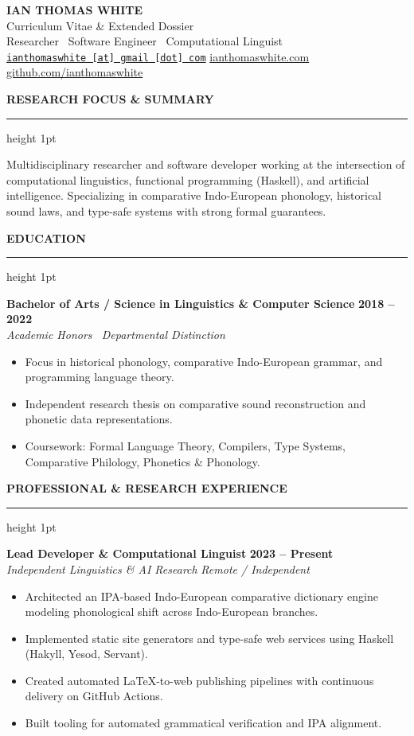 \documentclass[10pt,letterpaper]{article}
\newcommand{\cvsection}[1]{%
    \vspace{10pt}%
    {\large\bfseries\uppercase{#1}}%
    \vspace{2pt}%
    \hrule height 1pt%
    \vspace{6pt}%
}
\begin{document}
\begin{center}
    {\huge\bfseries IAN THOMAS WHITE} \\[4pt]
    {\large Curriculum Vitae \& Extended Dossier} \\[3pt]
    {\color{subtext} Researcher \textbar\ Software Engineer \textbar\ Computational Linguist} \\[4pt]
    \href{mailto:ianthomaswhite@gmail.com}{\texttt{ianthomaswhite\,[at]\,gmail\,[dot]\,com}} \quad\textbar\quad
    \href{https://ianthomaswhite.com}{ianthomaswhite.com} \quad\textbar\quad
    \href{https://github.com/ianthomaswhite}{github.com/ianthomaswhite}
\end{center}

\vspace{5pt}

\cvsection{Research Focus \& Summary}
Multidisciplinary researcher and software developer working at the intersection of computational linguistics, functional programming (Haskell), and artificial intelligence. Specializing in comparative Indo-European phonology, historical sound laws, and type-safe systems with strong formal guarantees.

\cvsection{Education}
\textbf{Bachelor of Arts / Science in Linguistics \& Computer Science} \hfill \textbf{2018 -- 2022} \\
{\color{subtext}\textit{Academic Honors \textbar\ Departmental Distinction}}
\begin{itemize}
    \item Focus in historical phonology, comparative Indo-European grammar, and programming language theory.
    \item Independent research thesis on comparative sound reconstruction and phonetic data representations.
    \item Coursework: Formal Language Theory, Compilers, Type Systems, Comparative Philology, Phonetics \& Phonology.
\end{itemize}

\cvsection{Professional \& Research Experience}
\textbf{Lead Developer \& Computational Linguist} \hfill \textbf{2023 -- Present} \\
\textit{Independent Linguistics \& AI Research} \hfill \textit{Remote / Independent}
\begin{itemize}
    \item Architected an IPA-based Indo-European comparative dictionary engine modeling phonological shift across Indo-European branches.
    \item Implemented static site generators and type-safe web services using Haskell (Hakyll, Yesod, Servant).
    \item Created automated LaTeX-to-web publishing pipelines with continuous delivery on GitHub Actions.
    \item Built tooling for automated grammatical verification and IPA alignment.
\end{itemize}
\end{document}
